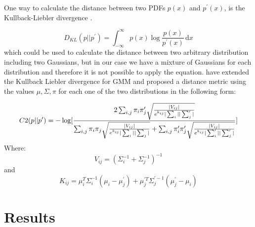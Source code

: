\documentclass{article}
\begin{document}
One way to calculate the distance between two PDFs \( p(x)\) and \(p^{\prime}(x) \), is the Kullback-Liebler divergence \cite{Introduction_to_Statistical_Pattern_Recognition}.



\begin{equation} \label{Kullback_Liebler_divergence}
D_{KL}(p||p^{\prime})=\int_{-\infty}^\infty p(x)\log\frac{p(x)}{p^{\prime}(x)}  \,\mathrm{d}x
\end{equation}
which could be used to calculate the distance between two arbitrary distribution including two Gaussians, but in our case we have a mixture of Gaussians for each distribution and therefore it is not possible to apply the equation. \citet{An_Analytic_Distance_Metric_for_Gaussian_Mixture_Models} have extended the Kullback Liebler divergence for GMM and proposed a distance metric using the values \(\mu ,\Sigma,\pi \) for each one of the two distributions in the following form:

\begin{equation} \label{Kullback_Liebler_divergence}
C2(p||p^{\prime})=-\log \large[ \frac{2\sum_{i,j}\pi_{i}\pi_{j}^{\prime} \sqrt{ \frac{|V_{ij}|}{e^{k_{ij}}|\sum_{i}| |\sum_{j}^{\prime}|} }  }
{
\sum_{i,j}\pi_{i}\pi_{j} \sqrt{ \frac{|V_{ij}|}{e^{k_{ij}}|\sum_{i}| |\sum_{j}|} }+
\sum_{i,j}\pi_{i}^{\prime}\pi_{j}^{\prime} \sqrt{ \frac{|V_{ij}|}{e^{k_{ij}}|\sum_{i}^{\prime}| |\sum_{j}^{\prime}|} }
} 
\large]
\end{equation}
Where:
\begin{equation}\label{Kullback_Liebler_divergence_Details1}
V_{ij}=(\Sigma_{i}^{-1} +\Sigma_{j}^{-1})^{-1}
\end{equation}
and
\begin{equation}\label{Kullback_Liebler_divergence_Details2}
K_{ij}=\mu_{i}^{T}\Sigma_{i}^{-1}(\mu_{i}-\mu_{j}^{\prime})+\mu_{j}^{\prime T}\Sigma_{j}^{\prime -1}(\mu_{j}^{\prime}-\mu_{i})
\end{equation}
\section{Results}\label{Results}
\end{document}

